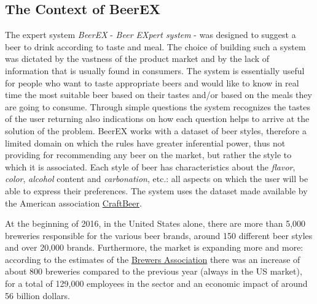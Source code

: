 \documentclass[12pt]{article}
\begin{document}
\subsection{The Context of BeerEX}
The expert system \textit{BeerEX} - \textit{Beer EXpert system} - was designed to suggest a beer to drink according to taste and meal. The choice of building such a system was dictated by the vastness of the product market and by the lack of information that is usually found in consumers. The system is essentially useful for people who want to taste appropriate beers and would like to know in real time the most suitable beer based on their tastes and/or based on the meals they are going to consume. Through simple questions the system recognizes the tastes of the user returning also indications on how each question helps to arrive at the solution of the problem. BeerEX works with a dataset of beer styles, therefore a limited domain on which the rules have greater inferential power, thus not providing for recommending any beer on the market, but rather the style to which it is associated. Each style of beer has characteristics about the \textit{flavor}, \textit{color}, \textit{alcohol} content and \textit{carbonation}, etc.: all aspects on which the user will be able to express their preferences. The system uses the dataset made available by the American association \href{https://www.craftbeer.com}{CraftBeer}. 

At the beginning of 2016, in the United States alone, there are more than 5,000 breweries responsible for the various beer brands, around 150 different beer styles and over 20,000 brands. Furthermore, the market is expanding more and more: according to the estimates of the \href{https://www.brewersassociation.org}{Brewers Association} there was an increase of about 800 breweries compared to the previous year (always in the US market), for a total of 129,000 employees in the sector and an economic impact of around 56 billion dollars.
\end{document}
